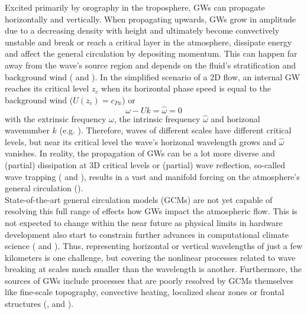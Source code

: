 Excited primarily by orography in the troposphere, GWs can propagate horizontally and vertically. When propagating upwards, GWs grow in amplitude due to a decreasing density with height and ultimately become convectively unstable and break or reach a critical layer in the atmosphere, dissipate energy and affect the general circulation by depositing momentum. This can happen far away from the wave's source region and depends on the fluid's stratification and background wind (\cite{teixeira_physics_2014} and \cite{eliassen_transfer_1960}). In the simplified scenario of a 2D flow, an internal GW reaches its critical level $z_c$ when its horizontal phase speed is equal to the background wind ($U(z_c)=c_{Px}$) or 
\begin{equation}
    \omega - U k = \hat{\omega} = 0
    \label{equ:critical_level_2D}
\end{equation}
with the extrinsic frequency $\omega$, the intrinsic frequency $\hat{\omega}$ and horizonal wavenumber $k$ (e.g. \cite[]{lin_mesoscale_2007}). Therefore, waves of different scales have different critical levels, but near its critical level the wave's horizonal wavelength grows and $\hat{\omega}$ vanishes. In reality, the propagation of GWs can be a lot more diverse and (partial) dissipation at 3D critical levels or (partial) wave reflection, so-called wave trapping (\cite{fritts_gravity_2018} and \cite{scorer_theory_1949}), results in a vast and manifold forcing on the atmosphere's general circulation (\cite{alexander_recent_2010}). \\
State-of-the-art general circulation models (GCMs) are not yet capable of resolving this full range of effects how GWs impact the atmospheric flow. This is not expected to change within the near future as physical limits in hardware development also start to constrain further advances in computational climate science (\cite{balaji_climbing_2021} and \cite{balaji_climate_2015}). Thus, representing horizontal or vertical wavelengths of just a few kilometers is one challenge, but covering the nonlinear processes related to wave breaking at scales much smaller than the wavelength is another. Furthermore, the sources of GWs include processes that are poorly resolved by GCMs themselves like fine-scale topography, convective heating, localized shear zones or frontal structures (\cite{medvedev_gravity_2019}, \cite{fritts_gravity_2003} and \cite{plougonven_internal_2014}). \\
